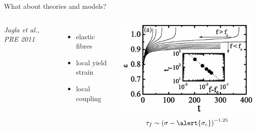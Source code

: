 \begin{frame}{What about theories and models?}
\begin{columns}
\begin{columns}
\textit{\footnotesize Jagla et al., PRE 2011}
\begin{itemize}
\item elastic fibres
\item local yield strain
\item local coupling
\end{itemize}

\hspace{1em}\includegraphics[width=\textwidth-1em]{Jagla_2011_gamma}
\[\tau_f\sim\left(\sigma-\alert{\sigma_c}\right)^{-1.25}\]


\end{columns}
\end{columns}
\end{frame}
